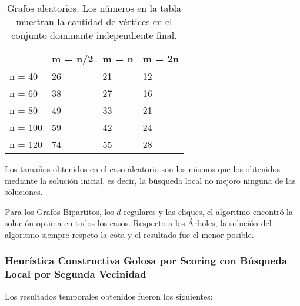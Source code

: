 \begin{table}[H]
\centering
\label{my-label}
\begin{tabular}{|l|lll|}
\hline
        & \multicolumn{1}{l|}{m = n/2} & \multicolumn{1}{l|}{m = n} & m = 2n \\ \hline
n = 40  & 26                           & 21                         & 12     \\ \cline{1-1}
n = 60  & 38                           & 27                         & 16     \\ \cline{1-1}
n = 80  & 49                           & 33                         & 21     \\ \cline{1-1}
n = 100 & 59                           & 42                         & 24     \\ \cline{1-1}
n = 120 & 74                           & 55                         & 28     \\ \hline
\end{tabular}
\caption{Grafos aleatorios. Los números en la tabla muestran la cantidad de vértices en el conjunto dominante independiente final.}
\end{table}

Los tamaños obtenidos en el caso aleatorio son los mismos que los obtenidos mediante la solución inicial, es decir, la búsqueda local no mejoro ninguna de las soluciones.

Para los Grafos Bipartitos, los $d$-regulares y las cliques, el algoritmo encontró la solución optima en todos los casos. Respecto a los Árboles, la solución del algoritmo siempre respeto la cota y el resultado fue el menor posible.

\subsubsection{Heurística Constructiva Golosa por Scoring con Búsqueda Local por Segunda Vecinidad}

Los resultados temporales obtenidos fueron los siguientes:

